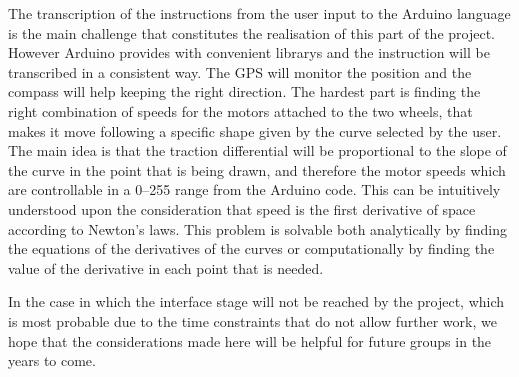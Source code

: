     The transcription of the instructions from the user input to the Arduino language is the main challenge that constitutes the realisation of this part of the project. However Arduino provides with convenient \glspl{library} and the instruction will be transcribed in a consistent way. The \gls{GPS} will monitor the position and the compass will help keeping the right direction. The hardest part is finding the right combination of speeds for the motors attached to the two wheels, that makes it move following a specific shape given by the curve selected by the user.\\
    The main idea is that the traction differential will be proportional to the slope of the curve in the point that is being drawn, and therefore the motor speeds which are controllable in a \numrange{0}{255} range from the Arduino code. This can be intuitively understood upon the consideration that speed is the first derivative of space according to Newton's laws. This problem is solvable both analytically by finding the equations of the derivatives of the curves or computationally by finding the value of the derivative in each point that is needed.

    In the case in which the interface stage will not be reached by the project, which is most probable due to the time constraints that do not allow further work, we hope that the considerations made here will be helpful for future groups in the years to come.

